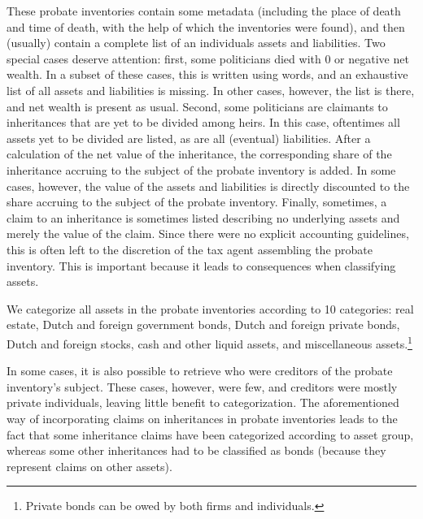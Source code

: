 These probate inventories contain some metadata (including the place of death and time of death, with the help of which the inventories were found), and then (usually) contain a complete list of an individuals assets and liabilities. Two special cases deserve attention: first, some politicians died with 0 or negative net wealth. In a subset of these cases, this is written using words, and an exhaustive list of all assets and liabilities is missing. In other cases, however, the list is there, and net wealth is present as usual. Second, some politicians are claimants to inheritances that are yet to be divided among heirs. In this case, oftentimes all assets yet to be divided are listed, as are all (eventual) liabilities. After a calculation of the net value of the inheritance, the corresponding share of the inheritance accruing to the subject of the probate inventory is added. In some cases, however, the value of the assets and liabilities is directly discounted to the share accruing to the subject of the probate inventory. Finally, sometimes, a claim to an inheritance is sometimes listed describing no underlying assets and merely the value of the claim. Since there were no explicit accounting guidelines, this is often left to the discretion of the tax agent assembling the probate inventory. This is important because it leads to consequences when classifying assets. 

We categorize all assets in the probate inventories according to 10 categories: real estate, Dutch and foreign government bonds, Dutch and foreign private bonds, Dutch and foreign stocks, cash and other liquid assets, and miscellaneous assets.\footnote{Private bonds can be owed by  both firms and individuals.}

In some cases, it is also possible to retrieve who were creditors of the probate inventory's subject. These cases, however, were few, and creditors were mostly private individuals, leaving little benefit to categorization. The aforementioned way of incorporating claims on inheritances in probate inventories leads to the fact that some inheritance claims have been categorized according to asset group, whereas some other inheritances had to be classified as bonds (because they represent claims on other assets). 


